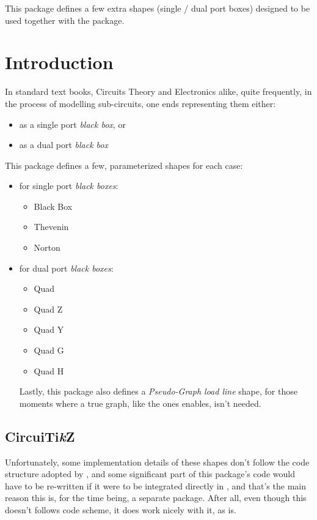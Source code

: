 \documentclass[10pt]{article}
\begin{document}
  

\begin{typesetabstract}
 
This package defines a few extra shapes (single / dual port boxes) designed to be used together with the  package.
\end{typesetabstract}

\tableofcontents

\section{Introduction}
In standard text books, Circuits Theory and Electronics alike, quite frequently, in the process of modelling sub-circuits, one ends representing them  either:
\begin{itemize}
  \item as a single port \emph{black box}, or
  \item as a dual port \emph{black box}
\end{itemize}

This package defines a few, parameterized shapes for each case:
\begin{itemize}
  \item for single port \emph{black boxes}:
  \begin{itemize}
    \item Black Box
    \item Thevenin
    \item Norton
  \end{itemize}
  \item for dual port \emph{black boxes}:
  \begin{itemize}
    \item Quad
    \item Quad Z
    \item Quad Y
    \item Quad G
    \item Quad H
  \end{itemize}
Lastly, this package also defines a \emph{Pseudo-Graph load line} shape, for those moments where a true graph, like the ones  enables, isn't needed.
\end{itemize}
 
 \subsection{CircuiTi\emph{k}Z}
 Unfortunately, some implementation details of these shapes don't follow the code structure  adopted by , and some significant part of this package's code would have to be re-written if it were to be integrated directly in , and that's the main reason this is, for the time being, a separate package. After all, even though this doesn't follows  code scheme, it does work nicely with it, as is.
 
\end{document}
